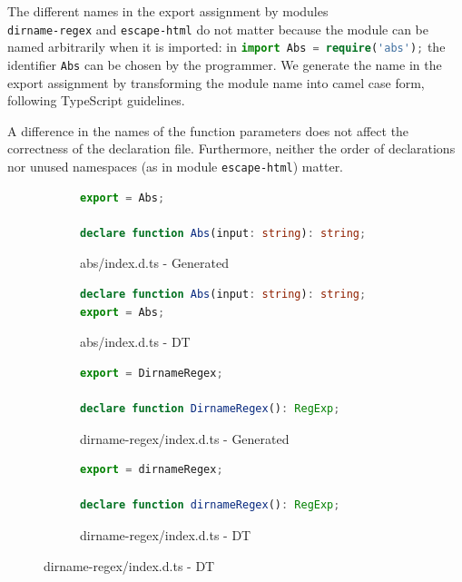 \documentclass[sigplan,screen]{acmart}
\begin{document}
The different names in the export assignment by modules \\
\texttt{dirname-regex} and
\texttt{escape-html} do not matter because the module can be named arbitrarily when it is imported: in
\lstinline[language=TypeScript]/import Abs = require('abs');/ the
identifier \lstinline[language=TypeScript]/Abs/ can be chosen by the
programmer. We generate the name in the export 
assignment by transforming the module name into camel case form, following TypeScript
guidelines.

A difference in the names of the function parameters does not affect the correctness of
the declaration file.
Furthermore, neither the order of declarations nor unused namespaces
(as in module \texttt{escape-html}) matter.

\begin{figure}[tp]
  \centering
  \begin{subfigure}[t]{0.48\linewidth}
    \begin{lstlisting}[language=TypeScript,numbers=none]
export = Abs;

declare function Abs(input: string): string;
    \end{lstlisting}
    \caption{abs/index.d.ts - Generated}
  \end{subfigure}
  \hfill
  \begin{subfigure}[t]{0.48\linewidth}
    \begin{lstlisting}[language=TypeScript,numbers=none]
declare function Abs(input: string): string;
export = Abs;
    \end{lstlisting}
    \caption{abs/index.d.ts - DT}
  \end{subfigure}


  \begin{subfigure}[t]{0.48\linewidth}
      \begin{lstlisting}[language=TypeScript,numbers=none]
export = DirnameRegex;

declare function DirnameRegex(): RegExp;
      \end{lstlisting}
      \caption{dirname-regex/index.d.ts - Generated}
    \end{subfigure}
    \hfill
    \begin{subfigure}[t]{0.48\linewidth}
      \begin{lstlisting}[language=TypeScript,numbers=none]
export = dirnameRegex;

declare function dirnameRegex(): RegExp;
      \end{lstlisting}
      \caption{dirname-regex/index.d.ts - DT}
    \end{subfigure}



\end{figure}
\end{document}
